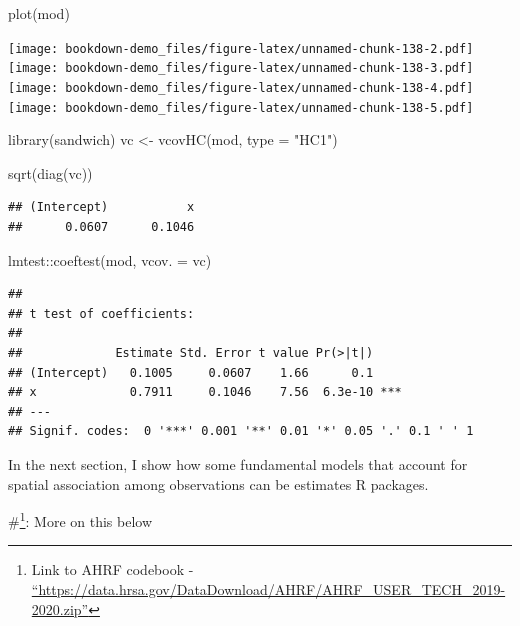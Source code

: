 \documentclass[
]{article}
\newenvironment{Shaded}{\begin{snugshade}}{\end{snugshade}}
\newcommand{\AttributeTok}[1]{\textcolor[rgb]{0.77,0.63,0.00}{#1}}
\newcommand{\FunctionTok}[1]{\textcolor[rgb]{0.00,0.00,0.00}{#1}}
\newcommand{\NormalTok}[1]{#1}
\newcommand{\OtherTok}[1]{\textcolor[rgb]{0.56,0.35,0.01}{#1}}
\newcommand{\SpecialCharTok}[1]{\textcolor[rgb]{0.00,0.00,0.00}{#1}}
\newcommand{\StringTok}[1]{\textcolor[rgb]{0.31,0.60,0.02}{#1}}
\begin{document}
\begin{Shaded}
\begin{Highlighting}[]
\FunctionTok{plot}\NormalTok{(mod)}
\end{Highlighting}
\end{Shaded}

\texttt{[image: bookdown-demo\_files/figure-latex/unnamed-chunk-138-2.pdf]} \texttt{[image: bookdown-demo\_files/figure-latex/unnamed-chunk-138-3.pdf]} \texttt{[image: bookdown-demo\_files/figure-latex/unnamed-chunk-138-4.pdf]} \texttt{[image: bookdown-demo\_files/figure-latex/unnamed-chunk-138-5.pdf]}

\begin{Shaded}
\begin{Highlighting}[]
\FunctionTok{library}\NormalTok{(sandwich)}
\NormalTok{vc }\OtherTok{\textless{}{-}} \FunctionTok{vcovHC}\NormalTok{(mod, }\AttributeTok{type =} \StringTok{"HC1"}\NormalTok{)}

\FunctionTok{sqrt}\NormalTok{(}\FunctionTok{diag}\NormalTok{(vc))}
\end{Highlighting}
\end{Shaded}

\begin{verbatim}
## (Intercept)           x 
##      0.0607      0.1046
\end{verbatim}

\begin{Shaded}
\begin{Highlighting}[]
\NormalTok{lmtest}\SpecialCharTok{::}\FunctionTok{coeftest}\NormalTok{(mod, }\AttributeTok{vcov. =}\NormalTok{ vc)}
\end{Highlighting}
\end{Shaded}

\begin{verbatim}
## 
## t test of coefficients:
## 
##             Estimate Std. Error t value Pr(>|t|)    
## (Intercept)   0.1005     0.0607    1.66      0.1    
## x             0.7911     0.1046    7.56  6.3e-10 ***
## ---
## Signif. codes:  0 '***' 0.001 '**' 0.01 '*' 0.05 '.' 0.1 ' ' 1
\end{verbatim}

\newpage

In the next section, I show how some fundamental models that account for spatial association among observations can be estimates R packages.

\#\footnote{Link to AHRF codebook - \href{https://data.hrsa.gov/DataDownload/AHRF/AHRF_USER_TECH_2019-2020.zip}{``https://data.hrsa.gov/DataDownload/AHRF/AHRF\_USER\_TECH\_2019-2020.zip''}}: More on this below
\end{document}
